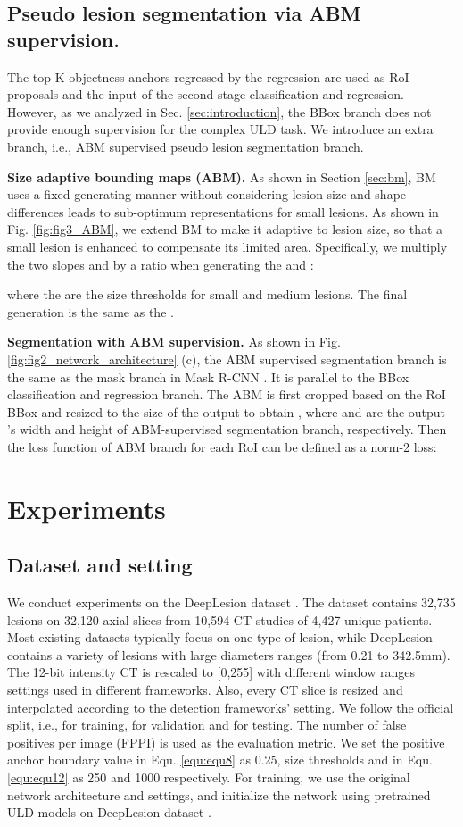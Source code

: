 \documentclass[runningheads]{llncs}
\begin{document}
\subsection{Pseudo lesion segmentation via ABM supervision.} \label{sec:abm}
The top-K objectness anchors regressed by the regression are used as RoI proposals and the input of the second-stage classification and regression. However, as we analyzed in Sec. \ref{sec:introduction}, the BBox branch does not provide enough supervision for the complex ULD task. We introduce an extra branch, i.e., ABM supervised pseudo lesion segmentation branch.

\textbf{Size adaptive bounding maps (ABM).}
As shown in Section \ref{sec:bm}, BM uses a fixed generating manner without considering lesion size and shape differences leads to sub-optimum representations for small lesions. As shown in Fig. \ref{fig:fig3_ABM}, we extend BM to make it adaptive to lesion size, so that a small lesion is enhanced to compensate its limited area. Specifically, we multiply the two slopes  and  by a ratio  when generating the  and :



where the  are the size thresholds for small and medium lesions.
The final  generation is the same as the .


\textbf{Segmentation with ABM supervision.}
As shown in Fig. \ref{fig:fig2_network_architecture} (c), the ABM  supervised segmentation branch is the same as the mask branch in Mask R-CNN \cite{he2017maskrcnn}. It is parallel to the BBox classification and regression branch. The ABM is first cropped based on the RoI BBox and resized to the size of the output to obtain , where  and  are the output  's width and height of ABM-supervised segmentation branch, respectively. Then the loss function of ABM branch for each RoI can be defined as a norm-2 loss:


\section{Experiments}
\subsection{Dataset and setting}
We conduct experiments on the DeepLesion dataset \cite{yan18deeplesion}.  The dataset contains 32,735 lesions on 32,120 axial slices from 10,594 CT studies of 4,427 unique patients. Most existing datasets typically focus on one type of lesion, while DeepLesion contains a variety of lesions with large diameters ranges (from 0.21 to 342.5mm). The 12-bit intensity CT is rescaled to [0,255] with different window ranges settings used in different frameworks. Also, every CT slice is resized and interpolated according to the detection frameworks' setting. We follow the official split, i.e.,  for training,  for validation and  for testing. The number of false positives per image (FPPI) is used as the evaluation metric. We set the positive anchor boundary value  in Equ. \ref{equ:equ8} as 0.25, size thresholds  and  in Equ. \ref{equ:equ12} as 250 and 1000 respectively. For training, we use the original network architecture and settings, and initialize the network using pretrained ULD models on DeepLesion dataset \cite{yan18deeplesion}.
\newsavebox{\tablebox}
\end{document}
